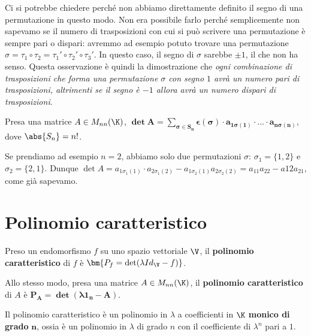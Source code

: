 \documentclass[11pt, a4paper, titlepage, oneside]{scrbook}
\begin{document}
Ci si potrebbe chiedere perché non abbiamo direttamente definito il segno di una permutazione in questo modo. Non era possibile farlo perché semplicemente non sapevamo se il numero di trasposizioni con cui si può scrivere una permutazione è sempre pari o dispari: avremmo ad esempio potuto trovare una permutazione $\sigma = \tau_1 \circ \tau_2 = \tau_1' \circ \tau_2' \circ \tau_3'$. In questo caso, il segno di $\sigma$ sarebbe $\pm 1$, il che non ha senso. Questa osservazione è quindi la dimostrazione che \textit{ogni combinazione di trasposizioni che forma una permutazione $\sigma$ con segno $1$ avrà un numero pari di trasposizioni, altrimenti se il segno è $-1$ allora avrà un numero dispari di trasposizioni}.


\begin{Proposizione}[]
\label{propos-matrice-permutazioni}
Presa una matrice $A \in M_{nn}(\K)$, $\bm{\det A = \sum_{\sigma \in S_n} \epsilon(\sigma) \cdot a_{1 \sigma(1)} \cdot \ldots \cdot a_{n\sigma(n)}}$, dove $\abs{S_n} = n!$.
\end{Proposizione}

Se prendiamo ad esempio $n = 2$, abbiamo solo due permutazioni $\sigma$: $\sigma_1 = \{1,2\}$ e $\sigma_2 = \{2,1\}$. Dunque \mbox{$\det A = a_{1\sigma_1(1)} \cdot a_{2 \sigma_1 (2)} - a_{1\sigma_2(1)} a_{2\sigma_2(2)} = a_{11}a_{22} - a{12}a_{21}$}, come già sapevamo.

\section{Polinomio caratteristico}

\begin{Definizione}
\label{def-polinomio-caratteristico}
Preso un endomorfismo $f$ su uno spazio vettoriale $\V$, il \textbf{polinomio caratteristico} di $f$ è $\bm{P_f = \det (\lambda Id_\V - f)}$.

Allo stesso modo, presa una matrice $A \in M_{nn}(\K)$, il \textbf{polinomio caratteristico} di $A$ è $\bm{P_A = \det (\lambda 1_n - A)}$.
\end{Definizione}

\begin{Osservazione}[]
\label{oss-polinomio-caratteristico-è-monico}
Il polinomio caratteristico è un polinomio in $\lambda$ a coefficienti in $\K$ \textbf{monico di grado} $\bm{n}$, ossia è un polinomio in $\lambda$ di grado $n$ con il coefficiente di $\lambda^n$ pari a $1$.
\end{Osservazione}
\end{document}
